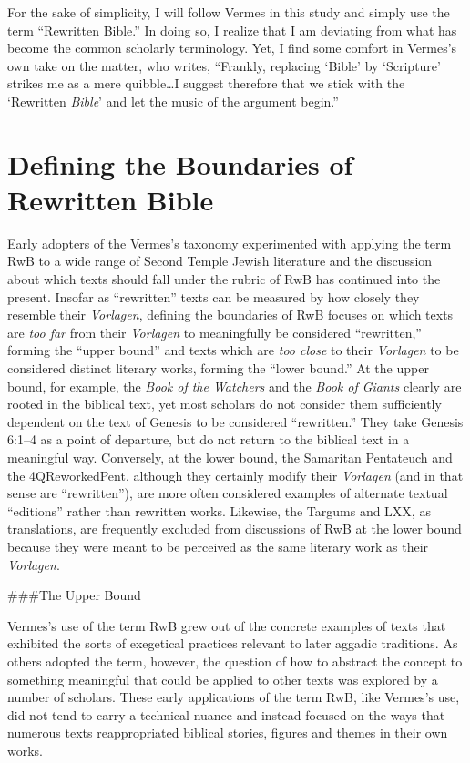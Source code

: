 For the sake of simplicity, I will follow Vermes in this study and
simply use the term ``Rewritten Bible.'' In doing so, I realize that I
am deviating from what has become the common scholarly terminology. Yet,
I find some comfort in Vermes's own take on the matter, who writes,
``Frankly, replacing `Bible' by `Scripture' strikes me as a mere
quibble\ldots{}I suggest therefore that we stick with the `Rewritten
\emph{Bible}' and let the music of the argument
begin.''\autocite[original emphasis]{vermes_zsengeller2014}

\hypertarget{defining-the-boundaries-of-rwb}{%
\section{Defining the Boundaries of
Rewritten Bible}\label{defining-the-boundaries-of-rwb}}

Early adopters of the Vermes's taxonomy experimented with applying the
term RwB to a wide range of Second Temple Jewish literature and the
discussion about which texts should fall under the rubric of RwB has
continued into the present. Insofar as ``rewritten'' texts can be
measured by how closely they resemble their \emph{Vorlagen}, defining
the boundaries of RwB focuses on which texts are \emph{too far} from
their \emph{Vorlagen} to meaningfully be considered ``rewritten,''
forming the ``upper bound'' and texts which are \emph{too close} to
their \emph{Vorlagen} to be considered distinct literary works, forming
the ``lower bound.'' At the upper bound, for example, the \emph{Book of
the Watchers} and the \emph{Book of Giants} clearly are rooted in the
biblical text, yet most scholars do not consider them sufficiently
dependent on the text of Genesis to be considered ``rewritten.'' They
take Genesis 6:1--4 as a point of departure, but do not return to the
biblical text in a meaningful way. Conversely, at the lower bound, the
Samaritan Pentateuch and the 4QReworkedPent, although they certainly
modify their \emph{Vorlagen} (and in that sense are ``rewritten''), are
more often considered examples of alternate textual ``editions'' rather
than rewritten works. Likewise, the Targums and LXX, as translations,
are frequently excluded from discussions of RwB at the lower bound
because they were meant to be perceived as the same literary work as
their \emph{Vorlagen}.

\#\#\#The Upper Bound

Vermes's use of the term RwB grew out of the concrete examples of texts
that exhibited the sorts of exegetical practices relevant to later
aggadic traditions. As others adopted the term, however, the question of
how to abstract the concept to something meaningful that could be
applied to other texts was explored by a number of scholars. These early
applications of the term RwB, like Vermes's use, did not tend to carry a
technical nuance and instead focused on the ways that numerous texts
reappropriated biblical stories, figures and themes in their own works.

